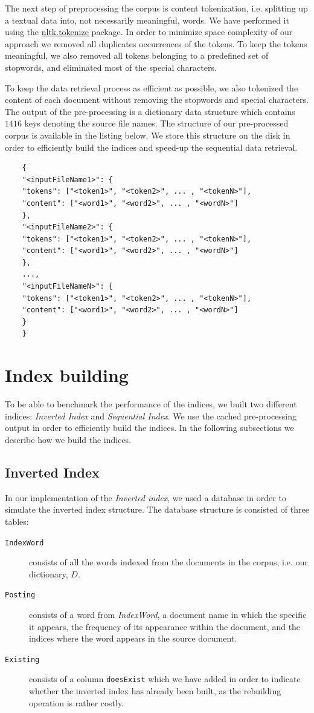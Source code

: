 \documentclass{article}
\begin{document}
	The next step of preprocessing the corpus is content tokenization, i.e. splitting up a textual data into, not necessarily meaningful, words. We have performed it using the \href{https://www.nltk.org/}{nltk.tokenize} package. In order to minimize space complexity of our approach we removed all duplicates occurrences of the tokens. To keep the tokens meaningful, we also removed all tokens belonging to a predefined set of stopwords, and eliminated most of the special characters.
	
	To keep the data retrieval process as efficient as possible, we also tokenized the content of each document without removing the stopwords and special characters. The output of the pre-processing is a dictionary data structure which contains $1416$ keys denoting the source file names. The structure of our pre-processed corpus is available in the listing below. We store this structure on the disk in order to efficiently build the indices and speed-up the sequential data retrieval.
	
	\begin{verbatim}
	{
	"<inputFileName1>": {
	"tokens": ["<token1>", "<token2>", ... , "<tokenN>"],
	"content": ["<word1>", "<word2>", ... , "<wordN>"]
	},
	"<inputFileName2>": {
	"tokens": ["<token1>", "<token2>", ... , "<tokenN>"],
	"content": ["<word1>", "<word2>", ... , "<wordN>"]
	},
	...,
	"<inputFileNameN>": {
	"tokens": ["<token1>", "<token2>", ... , "<tokenN>"],
	"content": ["<word1>", "<word2>", ... , "<wordN>"]
	}
	}
	\end{verbatim}
	
	\section{Index building}
	To be able to benchmark the performance of the indices, we built two different indices: \textit{Inverted Index} and \textit{Sequential Index}. 
	We use the cached pre-processing output in order to efficiently build the indices. In the following subsections we describe how we build the indices.
	
	\subsection{Inverted Index}
	In our implementation of the \textit{Inverted index}, we used a database in order to simulate the inverted index structure. The database structure is consisted of three tables:
	\begin{description}
		\item[\texttt{IndexWord}] consists of all the words indexed from the documents in the corpus, i.e. our dictionary, $D$.
		\item[\texttt{Posting}] consists of a word from \textit{IndexWord}, a document name in which the specific it appears, the frequency of its appearance within the document, and the indices where the word appears in the source document.
		\item[\texttt{Existing}] consists of a column \texttt{doesExist} which we have added in order to indicate whether the inverted index has already been built, as the rebuilding operation is rather costly.
	\end{description}
	
\end{document}
